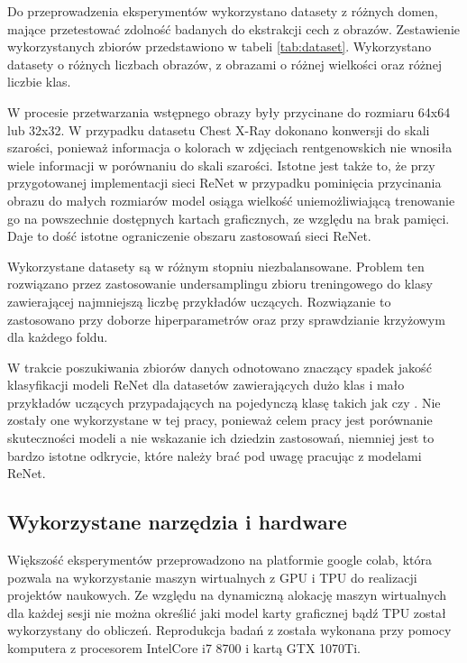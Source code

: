 \documentclass[oneside, mag]{mgr}
\begin{document}
Do przeprowadzenia eksperymentów wykorzystano datasety z różnych domen, mające przetestować zdolność badanych do ekstrakcji cech z obrazów. Zestawienie wykorzystanych zbiorów przedstawiono w tabeli \ref{tab:dataset}. Wykorzystano datasety o różnych liczbach obrazów, z obrazami o różnej wielkości oraz różnej liczbie klas.

W procesie przetwarzania wstępnego obrazy były przycinane do rozmiaru 64x64 lub 32x32. W przypadku datasetu Chest X-Ray dokonano konwersji do skali szarości, ponieważ informacja o kolorach w zdjęciach rentgenowskich nie wnosiła wiele informacji w porównaniu do skali szarości. Istotne jest także to, że przy przygotowanej implementacji sieci ReNet w przypadku pominięcia przycinania obrazu do małych rozmiarów model osiąga wielkość uniemożliwiającą trenowanie go na powszechnie dostępnych kartach graficznych, ze względu na brak pamięci. Daje to dość istotne ograniczenie obszaru zastosowań sieci ReNet. 

Wykorzystane datasety są w różnym stopniu niezbalansowane. Problem ten rozwiązano przez zastosowanie undersamplingu zbioru treningowego do klasy zawierającej najmniejszą liczbę przykładów uczących. Rozwiązanie to zastosowano przy doborze hiperparametrów oraz przy sprawdzianie krzyżowym dla każdego foldu.

W trakcie poszukiwania zbiorów danych odnotowano znaczący spadek jakość klasyfikacji modeli ReNet dla datasetów zawierających dużo klas i mało przykładów uczących przypadających na pojedynczą klasę takich jak \cite{fruits-dataset} czy \cite{face-dataset}. Nie zostały one wykorzystane w tej pracy, ponieważ celem pracy jest porównanie skuteczności modeli a nie wskazanie ich dziedzin zastosowań, niemniej jest to bardzo istotne odkrycie, które należy brać pod uwagę pracując z modelami ReNet.

\subsection{Wykorzystane narzędzia i hardware}

Większość eksperymentów przeprowadzono na platformie google colab, która pozwala na wykorzystanie maszyn wirtualnych z GPU i TPU do realizacji projektów naukowych. Ze względu na dynamiczną alokację maszyn wirtualnych dla każdej sesji nie można określić jaki model karty graficznej bądź TPU został wykorzystany do obliczeń. Reprodukcja badań z \cite{DBLP:journals/corr/VisinKCMCB15} została wykonana przy pomocy komputera z procesorem IntelCore i7 8700 i kartą GTX 1070Ti.
\end{document}
